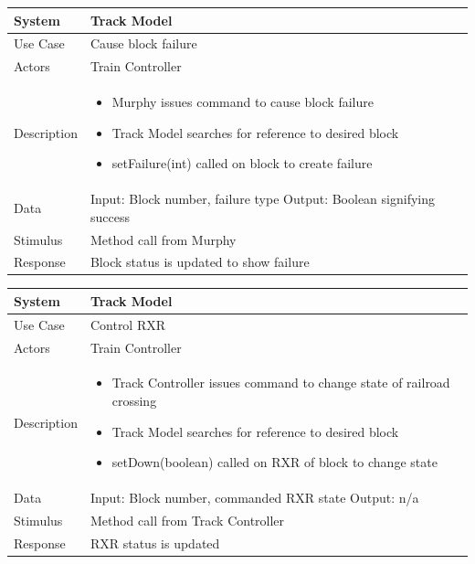 \documentclass{article}
\begin{document}
    \begin{longtable}{
    || >{\raggedright\arraybackslash}m{}
    | >{\raggedright\arraybackslash}m{}||}
    \hline
    \textbf{System} & \textbf{Track Model} \\
    \hline
    Use Case & Cause block failure\\
    \hline
    Actors & Train Controller\\
    \hline
    Description & \begin{itemize}
        \item Murphy issues command to cause block failure
        \item Track Model searches for reference to desired block
        \item setFailure(int) called on block to create failure
    \end{itemize}\\
    \hline
    Data & Input: Block number, failure type \newline Output: Boolean signifying success\\
    \hline
    Stimulus & Method call from Murphy\\
    \hline
    Response & Block status is updated to show failure\\
    \hline
    \end{longtable}
    
    \begin{longtable}{
    || >{\raggedright\arraybackslash}m{}
    | >{\raggedright\arraybackslash}m{}||}
    \hline
    \textbf{System} & \textbf{Track Model} \\
    \hline
    Use Case & Control RXR\\
    \hline
    Actors & Train Controller\\
    \hline
    Description & \begin{itemize}
        \item Track Controller issues command to change state of railroad crossing
        \item Track Model searches for reference to desired block
        \item setDown(boolean) called on RXR of block to change state
    \end{itemize}\\
    \hline
    Data & Input: Block number, commanded RXR state \newline Output: n/a\\
    \hline
    Stimulus & Method call from Track Controller\\
    \hline
    Response & RXR status is updated\\
    \hline
    \end{longtable}
    
\end{document}
